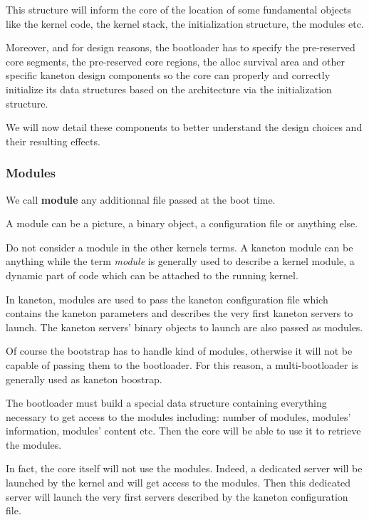 This structure will inform the core of the location of some
fundamental objects like the kernel code, the kernel stack, the
initialization structure, the modules etc.

Moreover, and for design reasons, the bootloader has to specify the
pre-reserved core segments, the pre-reserved core regions, the alloc
survival area and other specific kaneton design components so the core
can properly and correctly initialize its data structures based on the
architecture via the initialization structure.

We will now detail these components to better understand the design
choices and their resulting effects.

%
%

\subsubsection{Modules}

We call \textbf{module} any additionnal file passed at the boot time.

A module can be a picture, a binary object, a configuration file
or anything else.

Do not consider a module in the other kernels terms. A kaneton module
can be anything while the term \textit{module} is generally used to describe
a kernel module, a dynamic part of code which can be attached to the
running kernel.

In kaneton, modules are used to pass the kaneton configuration file
which contains the kaneton parameters and describes the very first
kaneton servers to launch. The kaneton servers' binary objects to
launch are also passed as modules.

Of course the bootstrap has to handle kind of modules, otherwise it will
not be capable of passing them to the bootloader. For this reason,
a multi-bootloader is generally used as kaneton boostrap.

The bootloader must build a special data structure containing everything
necessary to get access to the modules including: number of modules,
modules' information, modules' content etc. Then the core will be
able to use it to retrieve the modules.

In fact, the core itself will not use the modules. Indeed, a dedicated
server will be launched by the kernel and will get access to the modules.
Then this dedicated server will launch the very first servers described
by the kaneton configuration file.

